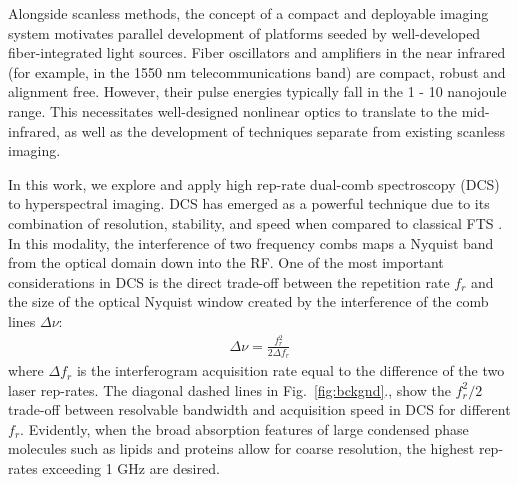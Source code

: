\documentclass[aip,preprint]{revtex4-1}
\begin{document}
Alongside scanless methods, the concept of a compact and deployable imaging system motivates parallel development of platforms seeded by well-developed fiber-integrated light sources. Fiber oscillators and amplifiers in the near infrared (for example, in the 1550 nm telecommunications band) are compact, robust and alignment free. However, their pulse energies typically fall in the 1 - 10 nanojoule range. This necessitates well-designed nonlinear optics to translate to the mid-infrared, as well as the development of techniques separate from existing scanless imaging.




In this work, we explore and apply high rep-rate dual-comb spectroscopy (DCS) to hyperspectral imaging. DCS has emerged as a powerful technique due to its combination of resolution, stability, and speed when compared to classical FTS \cite{coddingtonDualcombSpectroscopy2016}. In this modality, the interference of two frequency combs maps a Nyquist band from the optical domain down into the RF. One of the most important considerations in DCS is the direct trade-off between the repetition rate $f_r$ and the size of the optical Nyquist window created by the interference of the comb lines $\Delta \nu$:
% 
\begin{align}
    \Delta \nu = \frac{f_r^2}{2 \Delta f_r}
    \label{eq:dcs}
\end{align}
% 
where $\Delta f_r$ is the interferogram acquisition rate equal to the difference of the two laser rep-rates. The diagonal dashed lines in \mbox{Fig. \ref{fig:bckgnd}}., show the $f_r^2/2$ trade-off between resolvable bandwidth and acquisition speed in DCS for different $f_r$. Evidently, when the broad absorption features of large condensed phase molecules such as lipids and proteins allow for coarse resolution, the highest rep-rates exceeding 1 GHz are desired. 
\end{document}
